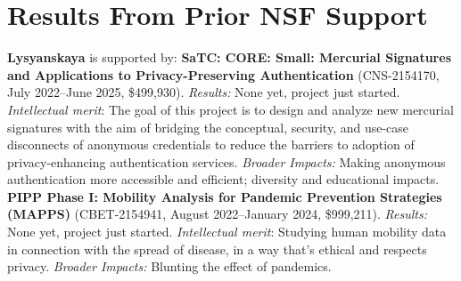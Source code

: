 %
%
%
%
%
%

\section{Results From Prior NSF Support}
\label{s:prior}

\noindent\textbf{Lysyanskaya} is supported by:
\textbf{SaTC: CORE: Small: Mercurial Signatures and Applications to Privacy-Preserving Authentication}
(CNS-2154170, July 2022--June 2025, \$499,930).
\textit{Results:} None yet, project just started. \textit{Intellectual merit}:  The goal of this project is to design and analyze new mercurial signatures with the aim of bridging the conceptual, security, and use-case disconnects of anonymous credentials to reduce the barriers to adoption of privacy-enhancing authentication services.
\textit{Broader Impacts:} Making anonymous authentication more accessible and efficient; diversity and educational impacts.  
\textbf{PIPP Phase I: Mobility Analysis for Pandemic Prevention Strategies (MAPPS)}
(CBET-2154941, August 2022--January 2024, \$999,211).
\textit{Results:} None yet, project just started. \textit{Intellectual merit}: Studying human mobility data in connection with the spread of disease, in a way that's ethical and respects privacy.
\textit{Broader Impacts:} Blunting the effect of pandemics.  

